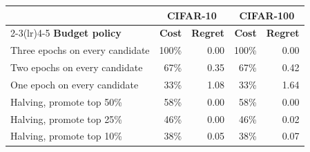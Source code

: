 \begin{tabular}{l rr rr}
\toprule
& \multicolumn{2}{c}{CIFAR-10} & \multicolumn{2}{c}{CIFAR-100} \\
\cmidrule(lr){2-3}\cmidrule(lr){4-5}
\textbf{Budget policy} & \textbf{Cost} & \textbf{Regret} & \textbf{Cost} & \textbf{Regret} \\
\midrule
Three epochs on every candidate & 100\% & 0.00 & 100\% & 0.00 \\
Two epochs on every candidate & 67\% & 0.35 & 67\% & 0.42 \\
One epoch on every candidate & 33\% & 1.08 & 33\% & 1.64 \\
Halving, promote top 50\% & 58\% & 0.00 & 58\% & 0.00 \\
Halving, promote top 25\% & 46\% & 0.00 & 46\% & 0.02 \\
Halving, promote top 10\% & 38\% & 0.05 & 38\% & 0.07 \\
\bottomrule
\end{tabular}
